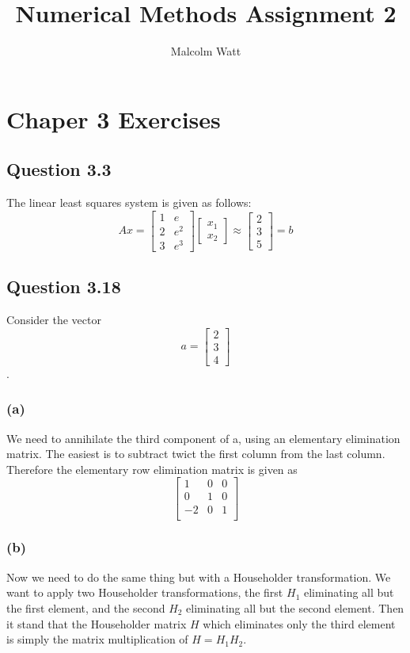 \documentclass[12pt,a4paper]{report}
\author{Malcolm Watt}
\title{Numerical Methods Assignment 2}
\begin{document}
\maketitle
\section*{Chaper 3 Exercises}
\subsection*{Question 3.3}
The linear least squares system is given as follows:
{\color{blue}
$$A x= 
\begin{bmatrix}
1 & e\\
2 & e^2\\
3 & e^3
\end{bmatrix}
\begin{bmatrix}
x_1 \\ x_2
\end{bmatrix}
\approx
\begin{bmatrix}
2 \\
3 \\
5
\end{bmatrix}
= b
$$
}
\subsection*{Question 3.18}
Consider the vector $$ a = \begin{bmatrix}2\\3\\4\end{bmatrix}$$.
\subsubsection{(a)}
We need to annihilate the third component of a, using an elementary elimination
matrix. The easiest is to subtract twict the first column from the last column.
Therefore the elementary row elimination matrix is given as
{\color{blue}
$$\begin{bmatrix}
1 & 0 & 0\\
0 & 1 & 0\\
-2 & 0 & 1\\
\end{bmatrix}$$
}
\subsubsection{(b)}
Now we need to do the same thing but with a Householder transformation.
We want to apply two Householder transformations, the first $H_1$ eliminating all
but the first element, and the second $H_2$ eliminating all but the second element.
Then it stand that the Householder matrix $H$ which eliminates only the third
element is simply the matrix multiplication of $H = H_1H_2$.
\end{document}

